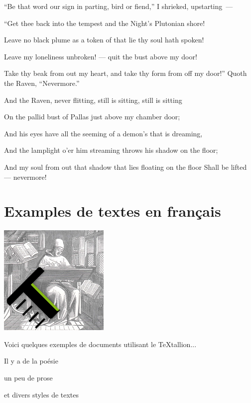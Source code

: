 \documentclass[openany]{book} %
\begin{document}
\bigskip
\par\noindent “Be that word our sign in parting, bird or fiend,” I shrieked, upstarting~—
\par\noindent “Get thee back into the tempest and the Night’s Plutonian shore!
\par\noindent Leave no black plume as a token of that lie thy soul hath spoken!
\par\noindent Leave my loneliness unbroken! — quit the bust above my door!
\par\noindent Take thy beak from out my heart, and take thy form from off my door!”
     Quoth the Raven, “Nevermore.”

\bigskip
\par\noindent And the Raven, never flitting, still is sitting, still is sitting
\par\noindent On the pallid bust of Pallas just above my chamber door;
\par\noindent And his eyes have all the seeming of a demon’s that is dreaming,
\par\noindent And the lamplight o’er him streaming throws his shadow on the floor;
\par\noindent And my soul from out that shadow that lies floating on the floor
     Shall be lifted — nevermore!

\parag 

\hypertarget{toc8}{}
\pagebreak[\PAGExBREAKxPOLICY]
\part{Examples de textes en français}

\includegraphics{../media/logo_textallion.png}

Voici quelques exemples de documents utilisant le TeXtallion...

\begin{compactenum}
\item Il y a de la poésie
\item un peu de prose
\item et divers styles de textes
\end{compactenum}
\end{document}
